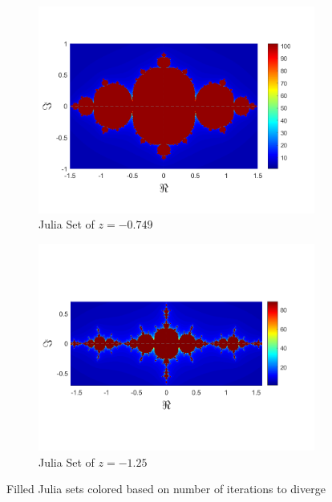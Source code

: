 \documentclass[letterpaper,11pt]{article}
\begin{document}
\begin{figure}
	\begin{subfigure}[b]{0.49\textwidth}
		\includegraphics[width=\textwidth]{../Figures/ColoredJulia3.png}
		\caption{Julia Set of $z = - 0.749$}
		\label{fig:CJ-.749}
	\end{subfigure}
	\begin{subfigure}[b]{0.49\textwidth}
		\includegraphics[width=\textwidth]{../Figures/ColoredJulia4.png}
		\caption{Julia Set of $z = -1.25$}
		\label{fig:CJ-1.25}
	\end{subfigure}
	\caption{Filled Julia sets colored based on number of iterations to diverge}
	\label{fig:CJwithC}
\end{figure}
\end{document}

